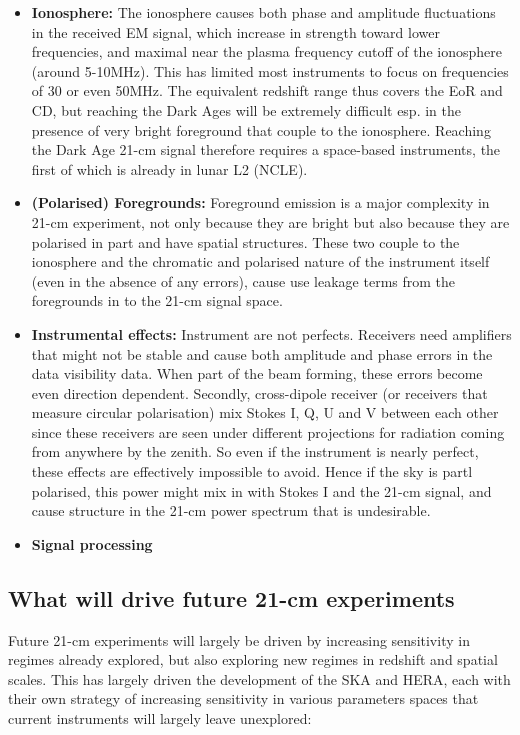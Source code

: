 \begin{itemize}
    \item {\bf Ionosphere:} The ionosphere causes both phase and amplitude fluctuations in the received EM signal, which increase in strength toward lower frequencies, and maximal near the plasma frequency cutoff of the ionosphere (around 5-10MHz). This has limited most instruments to focus on frequencies of 30 or even 50MHz. The equivalent redshift range thus covers the EoR and CD, but reaching the Dark Ages will be extremely difficult esp. in the presence of very bright foreground that couple to the ionosphere. Reaching the Dark Age 21-cm signal therefore requires a space-based instruments, the first of which is already in lunar L2 (NCLE).  
    \item {\bf (Polarised) Foregrounds:} Foreground emission is a major complexity in 21-cm experiment, not only because they are bright but also because they are polarised in part and have spatial structures. These two couple to the ionosphere and the chromatic and polarised nature of the instrument itself (even in the absence of any errors), cause use leakage terms from the foregrounds in to the 21-cm signal space.
    \item {\bf Instrumental effects:} Instrument are not perfects. Receivers need amplifiers that might not be stable and cause both amplitude and phase errors in the data visibility data. When part of the beam forming, these errors become even direction dependent. Secondly, cross-dipole receiver (or receivers that measure circular polarisation) mix Stokes I, Q, U and V between each other since these receivers are seen under different projections for radiation coming from anywhere by the zenith. So even if the instrument is nearly perfect, these effects are effectively impossible to avoid. Hence if the sky is partl polarised, this power might mix in with Stokes I and the 21-cm signal, and cause structure in the 21-cm power spectrum that is undesirable.    
    \item {\bf Signal processing}
\end{itemize}

\subsection{What will drive future 21-cm experiments}

Future 21-cm experiments will largely be driven by increasing sensitivity in regimes already explored, but also exploring new regimes in redshift and spatial scales. This has largely driven the development of the SKA and HERA, each with their own strategy of increasing sensitivity in various parameters spaces that current instruments will largely leave unexplored:

